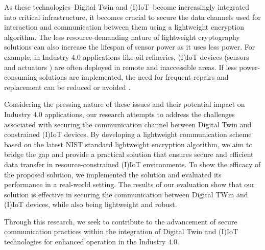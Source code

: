 
As these technologies--Digital Twin and (I)IoT--become increasingly integrated into critical infrastructure, it becomes crucial to secure the data channels used for interaction and communication between them using a lightweight encryption algorithm. The less resource-demanding nature of lightweight cryptography solutions can also increase the lifespan of sensor power as it uses less power. For example, in Industry 4.0 applications like oil refineries, (I)IoT devices (sensors and actuators ) are often deployed in remote and inaccessible areas. If less power-consuming solutions are implemented, the need for frequent repairs and replacement can be reduced or avoided \cite{williams_survey_2022, noauthor_lightweight_nodate}.


Considering the pressing nature of these issues and their potential impact on Industry 4.0 applications, our research attempts to address the challenges associated with securing the communication channel between Digital Twin and constrained (I)IoT devices. By developing a lightweight communication scheme based on the latest NIST standard lightweight encryption algorithm, we aim to bridge the gap and provide a practical solution that ensures secure and efficient data transfer in resource-constrained (I)IoT environments. To show the efficacy of the proposed solution, we implemented the solution and evaluated its performance in a real-world setting. The results of our evaluation show that our solution is effective in securing the communication between Digital TWin and (I)IoT devices, while also being lightweight and robust.

Through this research, we seek to contribute to the advancement of secure communication practices within the integration of Digital Twin and (I)IoT technologies for enhanced operation in the Industry 4.0.



